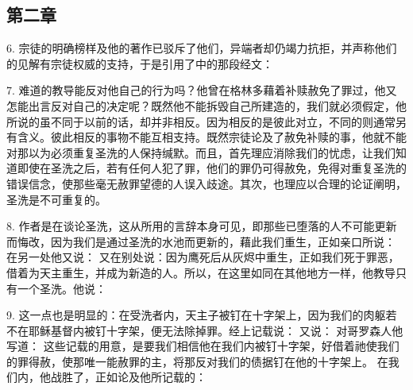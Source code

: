 
\subsection{第二章}

\par

6. 宗徒的明确榜样及他的著作已驳斥了他们，异端者却仍竭力抗拒，并声称他们的见解有宗徒权威的支持，于是引用了中的那段经文：\par

7. 难道的教导能反对他自己的行为吗？他曾在格林多藉着补赎赦免了罪过，他又怎能出言反对自己的决定呢？既然他不能拆毁自己所建造的，我们就必须假定，他所说的虽不同于以前的话，却并非相反。因为相反的是彼此对立，不同的则通常另有含义。彼此相反的事物不能互相支持。既然宗徒论及了赦免补赎的事，他就不能对那以为必须重复圣洗的人保持缄默。而且，首先理应消除我们的忧虑，让我们知道即使在圣洗之后，若有任何人犯了罪，他们的罪仍可得赦免，免得对重复圣洗的错误信念，使那些毫无赦罪望德的人误入歧途。其次，也理应以合理的论证阐明，圣洗是不可重复的。\par

8. 作者是在谈论圣洗，这从所用的言辞本身可见，即那些已堕落的人不可能更新而悔改，因为我们是通过圣洗的水池而更新的，藉此我们重生，正如亲口所说： 在另一处他又说： 又在别处说：因为鹰死后从灰烬中重生，正如我们死于罪恶，借着为天主重生，并成为新造的人。所以，在这里如同在其他地方一样，他教导只有一个圣洗。他说：\par

9. 这一点也是明显的：在受洗者内，天主子被钉在十字架上，因为我们的肉躯若不在耶稣基督内被钉十字架，便无法除掉罪。经上记载说：  又说：  对哥罗森人他写道：  这些记载的用意，是要我们相信他在我们内被钉十字架，好借着祂使我们的罪得赦，使那唯一能赦罪的主，将那反对我们的债据钉在他的十字架上。  在我们内，他战胜了，正如论及他所记载的： \par

